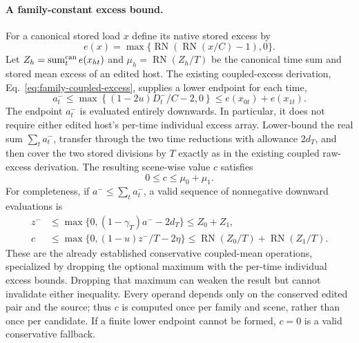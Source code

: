 \documentclass[11pt]{article}
\begin{document}
\paragraph{A family-constant excess bound.}
For a canonical stored load $x$ define its native stored excess by
\begin{equation}
e(x)=\max\{\operatorname{RN}(\operatorname{RN}(x/C)-1),0\}.
\end{equation}
Let $Z_h=\operatorname{sum}^{\rm can}_te(x_{ht})$ and $\mu_h=\operatorname{RN}(Z_h/T)$ be the canonical time sum and stored mean excess of an edited host. The existing coupled-excess derivation, Eq.~\eqref{eq:family-coupled-excess}, supplies a lower endpoint for each time,
\begin{equation}
a_t^-\le\max\left\{(1-2u)D_t^-/C-2,0\right\}\le e(x_{0t})+e(x_{1t}).
\label{eq:aggregate-coupled-cell}
\end{equation}
The endpoint $a_t^-$ is evaluated entirely downwards. In particular, it does not require either edited host's per-time individual excess array. Lower-bound the real sum $\sum_ta_t^-$, transfer through the two time reductions with allowance $2d_T$, and then cover the two stored divisions by $T$ exactly as in the existing coupled raw-excess derivation. The resulting scene-wise value $c$ satisfies
\begin{equation}
0\le c\le\mu_0+\mu_1.
\label{eq:aggregate-coupled-mean}
\end{equation}
For completeness, if $a^-\le\sum_ta_t^-$, a valid sequence of nonnegative downward evaluations is
\begin{align}
z^-&\le\max\{0,(1-\gamma_T)a^--2d_T\}\le Z_0+Z_1,\\
c&\le\max\{0,(1-u)z^-/T-2\eta\}\le\operatorname{RN}(Z_0/T)+\operatorname{RN}(Z_1/T).
\label{eq:aggregate-coupled-transfer}
\end{align}
These are the already established conservative coupled-mean operations, specialized by dropping the optional maximum with the per-time individual excess bounds. Dropping that maximum can weaken the result but cannot invalidate either inequality. Every operand depends only on the conserved edited pair and the source; thus $c$ is computed once per family and scene, rather than once per candidate. If a finite lower endpoint cannot be formed, $c=0$ is a valid conservative fallback.
\end{document}
